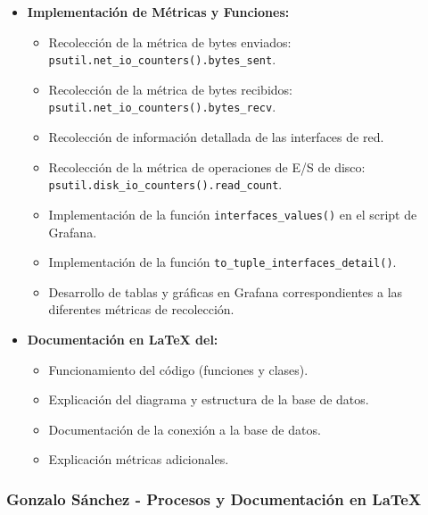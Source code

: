 \documentclass{article}
\begin{document}
\begin{itemize}
    \item \textbf{Implementación de Métricas y Funciones:}
    \begin{itemize}
        \item Recolección de la métrica de bytes enviados: \texttt{psutil.net\_io\_counters().bytes\_sent}.
        \item Recolección de la métrica de bytes recibidos: \texttt{psutil.net\_io\_counters().bytes\_recv}.
        \item Recolección de información detallada de las interfaces de red.
        \item Recolección de la métrica de operaciones de E/S de disco: \texttt{psutil.disk\_io\_counters().read\_count}.
        \item Implementación de la función \texttt{interfaces\_values()} en el script de Grafana.
        \item Implementación de la función \texttt{to\_tuple\_interfaces\_detail()}.
        \item Desarrollo de tablas y gráficas en Grafana correspondientes a las diferentes métricas de recolección.
    \end{itemize}
    \item \textbf{Documentación en \LaTeX{} del:}
    \begin{itemize}
        \item Funcionamiento del código (funciones y clases).
        \item Explicación del diagrama y estructura de la base de datos.
        \item Documentación de la conexión a la base de datos.
        \item Explicación métricas adicionales.
    \end{itemize}
\end{itemize}

\subsubsection{Gonzalo Sánchez - Procesos y Documentación en \LaTeX{}}
\end{document}
